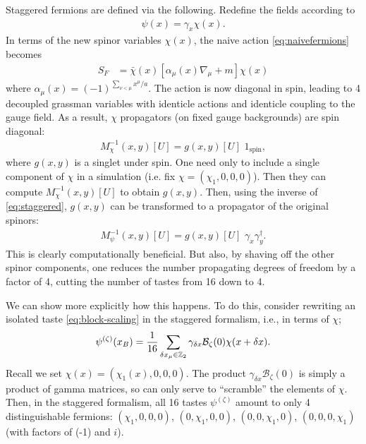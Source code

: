 Staggered fermions are defined via the following. Redefine the fields according to
\begin{align}
 \psi(x) = \gamma_x \chi(x).
 \label{eq:staggered}
\end{align}
In terms of the new spinor variables $\chi(x)$, the naive action \eqref{eq:naivefermions} becomes
\begin{align}
  S_F &= \bar{\chi}(x)[\alpha_{\mu}(x) \nabla_{\mu} + m ] \chi(x)
\end{align}
where $\alpha_{\mu}(x) = (-1)^{\sum_{\nu < \mu} x^{\mu}/a}$. The action is now diagonal in spin, leading to 4 decoupled grassman variables with identicle actions and identicle coupling to the gauge field. As a result, $\chi$ propagators (on fixed gauge backgrounds) are spin diagonal:
\begin{align}
	M^{-1}_{\chi}(x,y)[U] = g(x,y)[U] \,\, 1_{\text{spin}},
\end{align}
where $g(x,y)$ is a singlet under spin. One need only to include a single component of $\chi$ in a simulation (i.e. fix $\chi = (\chi_1,0,0,0)$). Then they can compute $M^{-1}_{\chi}(x,y)[U]$ to obtain $g(x,y)$. Then, using the inverse of \eqref{eq:staggered}, $g(x,y)$ can be transformed to a propagator of the original spinors:
\begin{align}
	M_{\psi}^{-1}(x,y)[U] = g(x,y)[U] \,\,\gamma_x \gamma^{\dagger}_y.
\end{align}
This is clearly computationally beneficial. But also, by shaving off the other spinor components, one reduces the number propagating degrees of freedom by a factor of 4, cutting the number of tastes from 16 down to 4.

We can show more explicitly how this happens. To do this, consider rewriting an isolated taste \eqref{eq:block-scaling} in the staggered formalism, i.e., in terms of $\chi$;
\begin{align}
  \psi^{(\zeta)}(x_B) = {1\over 16} \sum_{\delta x_{\mu} \in \mathbb{Z}_2} \gamma_{\delta x} \mathcal{B}_{\zeta}(0) \chi(x+\delta x).
\end{align}
Recall we set $\chi(x) = (\chi_1(x),0,0,0)$. The product $\gamma_{\delta x} \mathcal{B}_{\zeta}(0)$ is simply a product of gamma matrices, so can only serve to ``scramble'' the elements of $\chi$. Then, in the staggered formalism, all 16 tastes $\psi^{(\zeta)}$ amount to only 4 distinguishable fermions: $(\chi_1,0,0,0)$, $(0,\chi_1,0,0)$, $(0,0,\chi_1,0)$, $(0,0,0,\chi_1)$ (with factors of (-1) and $i$).

